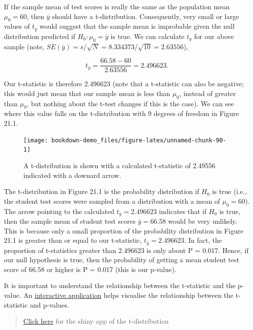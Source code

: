 \documentclass[
]{scrbook}
\begin{document}
If the sample mean of test scores is really the same as the population mean \(\mu_{0} = 60\), then \(\bar{y}\) should have a t-distribution.
Consequently, very small or large values of \(t_{\bar{y}}\) would suggest that the sample mean is improbable given the null distribution predicted if \(H_{0}: \mu_{0} = \bar{y}\) is true.
We can calculate \(t_{\bar{y}}\) for our above sample (note, \(SE(\bar{y}) = s/\sqrt{N} = 8.334373 / \sqrt{10} = 2.63556\)),

\[t_{\bar{y}} = \frac{66.58 - 60}{2.63556} = 2.496623.\]

Our t-statistic is therefore 2.496623 (note that a t-statistic can also be negative; this would just mean that our sample mean is less than \(\mu_{0}\), instead of greater than \(\mu_{0}\), but nothing about the t-test changes if this is the case).
We can see where this value falls on the t-distribution with 9 degrees of freedom in Figure 21.1.

\begin{figure}
\texttt{[image: bookdown-demo\_files/figure-latex/unnamed-chunk-90-1]} \caption{A t-distribution is shown with a calculated t-statistic of 2.49556 indicated with a downard arrow.}\label{fig:unnamed-chunk-90}
\end{figure}

The t-distribution in Figure 21.1 is the probability distribution if \(H_{0}\) is true (i.e., the student test scores were sampled from a distribution with a mean of \(\mu_{0} = 60\)).
The arrow pointing to the calculated \(t_{\bar{y}} = 2.496623\) indicates that if \(H_{0}\) is true, then the sample mean of student test scores \(\bar{y} = 66.58\) would be very unlikely.
This is because only a small proportion of the probability distribution in Figure 21.1 is greater than or equal to our t-statistic, \(t_{\bar{y}} = 2.496623\).
In fact, the proportion of t-statistics greater than 2.496623 is only about P = 0.017.
Hence, if our null hypothesis is true, then the probability of getting a mean student test score of 66.58 or higher is P = 0.017 (this is our p-value).

It is important to understand the relationship between the t-statistic and the p-value.
An \href{https://bradduthie.shinyapps.io/t_score/}{interactive application} helps visualise the relationship between the t-statistic and p-values.

\begin{quote}
\href{https://bradduthie.shinyapps.io/t_score/}{Click here} for the shiny app of the t-distribution
\end{quote}
\end{document}
